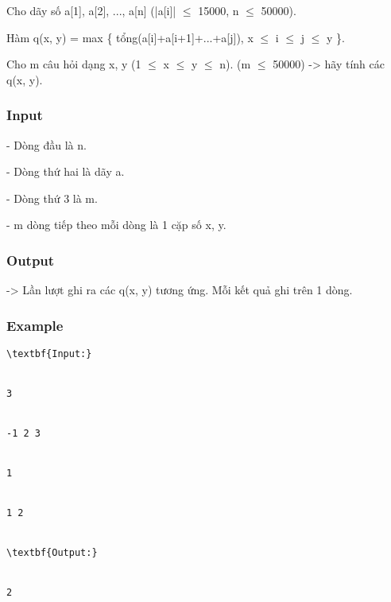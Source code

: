 



   Cho dãy số a[1], a[2], ..., a[n] (|a[i]|  $\le$  15000, n  $\le$  50000).  

   Hàm q(x, y) = max \{ tổng(a[i]+a[i+1]+...+a[j]), x  $\le$  i  $\le$  j  $\le$  y \}.  

   Cho m câu hỏi dạng x, y (1  $\le$  x  $\le$  y  $\le$  n). (m  $\le$  50000) -> hãy tính các q(x, y).   







\subsubsection{   Input  }

   - Dòng đầu là n.  

   - Dòng thứ hai là dãy a.  

   - Dòng thứ 3 là m.  

   - m dòng tiếp theo mỗi dòng là 1 cặp số x, y.  

\subsubsection{   Output  }

   -> Lần lượt ghi ra các q(x, y) tương ứng. Mỗi kết quả ghi trên 1 dòng.  

\subsubsection{   Example  }
\begin{verbatim}
\textbf{Input:}


3


-1 2 3


1


1 2


\textbf{Output:}


2


\end{verbatim}
